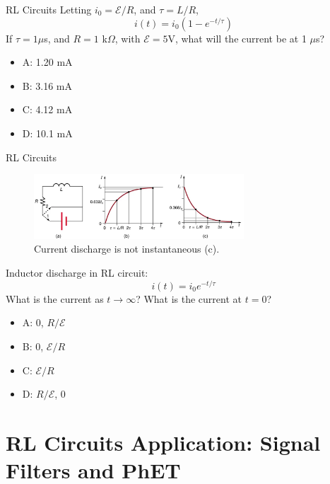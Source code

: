 \documentclass{beamer}
\begin{document}
\begin{frame}{RL Circuits}
Letting $i_0 = \mathcal{E}/R$, and $\tau = L/R$,
\begin{equation}
i(t) = i_0\left(1 - e^{-t/\tau}\right)
\end{equation}
If $\tau = 1 \mu$s, and $R = 1$ k$\Omega$, with $\mathcal{E} = 5$V, what will the current be at 1 $\mu$s?
\begin{itemize}
\item A: 1.20 mA
\item B: 3.16 mA
\item C: 4.12 mA
\item D: 10.1 mA
\end{itemize}
\end{frame}

\begin{frame}{RL Circuits}
\footnotesize
\begin{figure}
\centering
\includegraphics[width=0.7\textwidth]{figures/RL_circuit.png}
\caption{\label{fig:RL2} Current discharge is not instantaneous (c).}
\end{figure}
Inductor discharge in RL circuit:
\begin{equation}
i(t) = i_0 e^{-t/\tau}
\end{equation}
What is the current as $t \to \infty$?  What is the current at $t=0$?
\begin{itemize}
\item A: 0, $R/\mathcal{E}$
\item B: 0, $\mathcal{E}/R$
\item C: $\mathcal{E}/R$
\item D: $R/\mathcal{E}$, 0
\end{itemize}
\end{frame}

\section{RL Circuits Application: Signal Filters and PhET}
\end{document}
